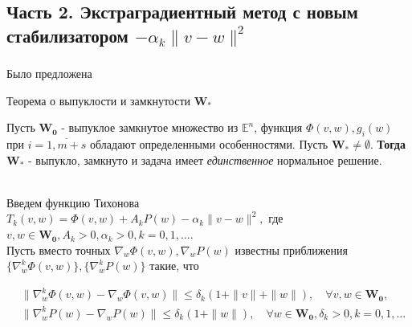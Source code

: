 \documentclass[unicode, t, 11pt]{beamer}%
\begin{document}
\subsection{Часть 2. Экстраградиентный метод с новым стабилизатором $-\alpha_k\|v-w\|^2$}
\begin{frame}
\frametitle{\insertsection}
\framesubtitle{\insertsubsection}
Было предложена
\begin{block}{Теорема о выпуклости и замкнутости $\mathbf{W_*}$}
	\begin{small}
		Пусть $\mathbf{W_0}$ - выпуклое замкнутое множество из $\mathbb{E}^n$, функция $\Phi(v,w), g_i(w)$ при $i=\overline{1,m+s}$ обладают определенными особенностями. Пусть $\mathbf{W_*}\ne\emptyset$. \textbf{Тогда} $\mathbf{W_*}$ - выпукло, замкнуто и задача имеет \textit{единственное} нормальное решение.
	\end{small}
\end{block}
\,\\
Введем функцию Тихонова\\
$T_k(v,w)=\Phi(v,w)+A_kP(w)-\alpha_k\|v-w\|^2,$ где $v,w\in \mathbf{W_0},A_k>0,\alpha_k>0,k=0,1,\ldots$.\\
Пусть вместо точных $\nabla_w\Phi(v,w),\nabla_wP(w)$ известны приближения $\{\nabla_w^k\Phi(v,w)\},\{\nabla_w^kP(w)\}$ такие, что
\begin{footnotesize}
\begin{equation}
\label{[3]-6}
\begin{aligned}
&\|\nabla_w^k\Phi(v,w)-\nabla_w\Phi(v,w)\|\leqslant \delta_k(1+\|v\|+\|w\|),\quad \forall v,w\in \mathbf{W_0},\\
&\|\nabla_w^kP(w)-\nabla_wP(w)\|\leqslant \delta_k(1+\|w\|),\quad\forall w\in \mathbf{W_0},\delta_k>0,k=0,1,\ldots 
\end{aligned}
\end{equation}
\end{footnotesize}
\end{frame}
\end{document}
